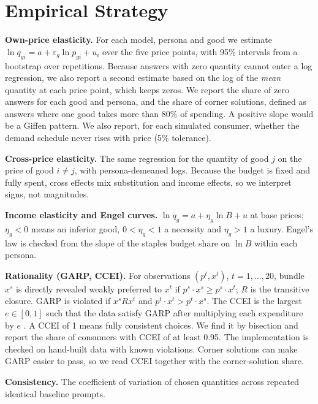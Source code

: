 \documentclass[11pt,a4paper]{article}
\begin{document}
\section{Empirical Strategy}
\textbf{Own-price elasticity.} For each model, persona and good we estimate $\ln q_{gi}=a+\varepsilon_{g}\ln p_{gi}+u_{i}$ over the five price points, with 95\% intervals from a bootstrap over repetitions. Because answers with zero quantity cannot enter a log regression, we also report a second estimate based on the log of the \emph{mean} quantity at each price point, which keeps zeros. We report the share of zero answers for each good and persona, and the share of corner solutions, defined as answers where one good takes more than 80\% of spending. A positive slope would be a Giffen pattern. We also report, for each simulated consumer, whether the demand schedule never rises with price (5\% tolerance).

\textbf{Cross-price elasticity.} The same regression for the quantity of good $j$ on the price of good $i\neq j$, with persona-demeaned logs. Because the budget is fixed and fully spent, cross effects mix substitution and income effects, so we interpret signs, not magnitudes.

\textbf{Income elasticity and Engel curves.} $\ln q_{g}=a+\eta_g\ln B+u$ at base prices; $\eta_g<0$ means an inferior good, $0<\eta_g<1$ a necessity and $\eta_g>1$ a luxury. Engel's law is checked from the slope of the staples budget share on $\ln B$ within each persona.

\textbf{Rationality (GARP, CCEI).} For observations $(p^t,x^t)$, $t=1,\dots,20$, bundle $x^s$ is directly revealed weakly preferred to $x^t$ if $p^s\!\cdot x^s\ge p^s\!\cdot x^t$; $R$ is the transitive closure. GARP is violated if $x^sRx^t$ and $p^t\!\cdot x^t>p^t\!\cdot x^s$. The CCEI is the largest $e\in[0,1]$ such that the data satisfy GARP after multiplying each expenditure by $e$ \citep{afriat1973,varian1990}. A CCEI of 1 means fully consistent choices. We find it by bisection and report the share of consumers with CCEI of at least 0.95. The implementation is checked on hand-built data with known violations. Corner solutions can make GARP easier to pass, so we read CCEI together with the corner-solution share.

\textbf{Consistency.} The coefficient of variation of chosen quantities across repeated identical baseline prompts.
\end{document}
